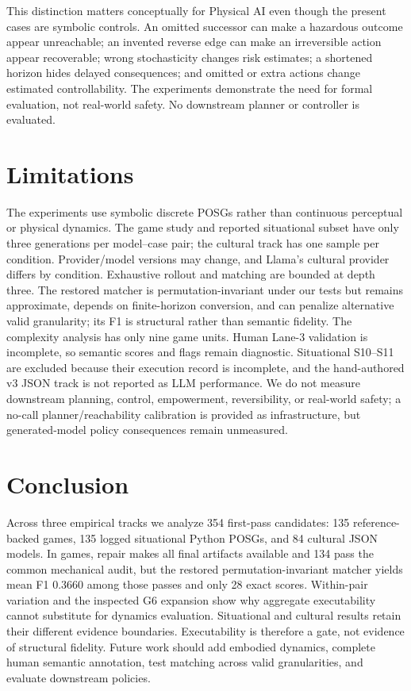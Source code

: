\documentclass{article}
\begin{document}
This distinction matters conceptually for Physical AI even though the present cases are symbolic controls. An omitted successor can make a hazardous outcome appear unreachable; an invented reverse edge can make an irreversible action appear recoverable; wrong stochasticity changes risk estimates; a shortened horizon hides delayed consequences; and omitted or extra actions change estimated controllability. The experiments demonstrate the need for formal evaluation, not real-world safety. No downstream planner or controller is evaluated.

\section{Limitations}
The experiments use symbolic discrete POSGs rather than continuous perceptual or physical dynamics. The game study and reported situational subset have only three generations per model--case pair; the cultural track has one sample per condition. Provider/model versions may change, and Llama's cultural provider differs by condition. Exhaustive rollout and matching are bounded at depth three. The restored matcher is permutation-invariant under our tests but remains approximate, depends on finite-horizon conversion, and can penalize alternative valid granularity; its F1 is structural rather than semantic fidelity. The complexity analysis has only nine game units. Human Lane-3 validation is incomplete, so semantic scores and flags remain diagnostic. Situational S10--S11 are excluded because their execution record is incomplete, and the hand-authored v3 JSON track is not reported as LLM performance. We do not measure downstream planning, control, empowerment, reversibility, or real-world safety; a no-call planner/reachability calibration is provided as infrastructure, but generated-model policy consequences remain unmeasured.

\section{Conclusion}
\label{sec:conclusion}
Across three empirical tracks we analyze 354 first-pass candidates: 135 reference-backed games, 135 logged situational Python POSGs, and 84 cultural JSON models. In games, repair makes all final artifacts available and 134 pass the common mechanical audit, but the restored permutation-invariant matcher yields mean F1 0.3660 among those passes and only 28 exact scores. Within-pair variation and the inspected G6 expansion show why aggregate executability cannot substitute for dynamics evaluation. Situational and cultural results retain their different evidence boundaries. Executability is therefore a gate, not evidence of structural fidelity. Future work should add embodied dynamics, complete human semantic annotation, test matching across valid granularities, and evaluate downstream policies.
\end{document}
